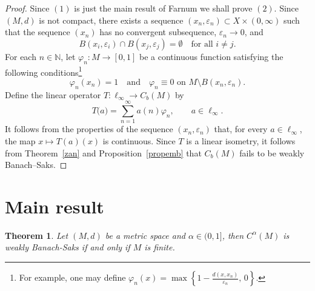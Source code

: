 \documentclass[11pt, reqno]{amsart}
\newtheorem{thm}{Theorem}[section]
\begin{document}
\begin{proof}
Since $(1)$ is just the main result of Farnum \cite{farnum_banach-saks_1974} we shall prove $(2)$. Since $(M,d)$ is not compact, there exists a sequence $(x_n,\varepsilon_n) \subset X \times (0,\infty)$ such that the sequence $(x_n)$ has no convergent subsequence, $\varepsilon_n \to 0$, and
\[
B(x_i,\varepsilon_i) \cap B(x_j,\varepsilon_j) = \emptyset %
\quad \text{for all } i \neq j.
\]
For each $n \in \mathbb{N}$, let $\varphi_n : M \to [0,1]$ be a continuous function satisfying the following conditions\footnote{For example, one may define $\varphi_n(x)=\max\left\{1-\frac{d(x,x_n)}{\varepsilon_n},\,0\right\}$.}
\[
\varphi_n(x_n) = 1 
\quad \text{and} \quad 
\varphi_n \equiv 0 \text{ on } M \setminus B(x_n,\varepsilon_n).
\]
Define the linear operator $T \colon \ell_\infty \to C_b(M)$ by
\[
T\big(a\big) = \sum_{n=1}^{\infty} a(n) \varphi_n, 
\qquad a \in \ell_\infty.
\]
It follows from the properties of the sequence $(x_n,\varepsilon_n)$ that, for every $a \in \ell_\infty$, the map $x \mapsto T(a)(x)$ is continuous. Since $T$ is a linear isometry, it follows from Theorem~\ref{zan} and Proposition~\ref{propemb} that $C_b(M)$ fails to be weakly Banach--Saks.


\end{proof}










\section{Main result}

\begin{thm} Let $(M,d)$ be a metric space and $\alpha \in (0,1]$, then $C^\alpha(M)$ is weakly Banach-Saks if and only if $M$ is finite.
\end{thm}
\end{document}
